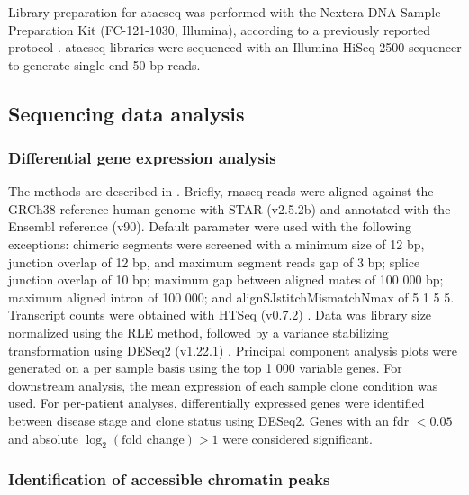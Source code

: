 \subsubsection{}

Library preparation for \gls{atacseq} was performed with the Nextera DNA Sample Preparation Kit (FC-121-1030, Illumina), according to a previously reported protocol \cite{buenrostroTranspositionNativeChromatin2013}.
\Gls{atacseq} libraries were sequenced with an Illumina HiSeq 2500 sequencer to generate single-end 50 bp reads.

\subsection{Sequencing data analysis}

\subsubsection{Differential gene expression analysis}

The methods are described in \cite[REF][]{dobsonRelapseFatedLatentDiagnosis2020}.
Briefly, \gls{rnaseq} reads were aligned against the GRCh38 reference human genome with STAR (v2.5.2b) \cite{dobinSTARUltrafastUniversal2013} and annotated with the Ensembl reference (v90).
Default parameter were used with the following exceptions: chimeric segments were screened with a minimum size of 12 bp, junction overlap of 12 bp, and maximum segment reads gap of 3 bp; splice junction overlap of 10 bp; maximum gap between aligned mates of 100 000 bp; maximum aligned intron of 100 000; and alignSJstitchMismatchNmax of 5 1 5 5.
Transcript counts were obtained with HTSeq (v0.7.2) \cite{andersHTSeqPythonFramework2015}.
Data was library size normalized using the RLE method, followed by a variance stabilizing transformation using DESeq2 (v1.22.1) \cite{loveModeratedEstimationFold2014}.
Principal component analysis plots were generated on a per sample basis using the top 1 000 variable genes.
For downstream analysis, the mean expression of each sample clone condition was used.
For per-patient analyses, differentially expressed genes were identified between disease stage and clone status using DESeq2.
Genes with an \gls{fdr} $< 0.05$ and absolute $\log_2(\text{fold change}) > 1$ were considered significant.

\subsubsection{Identification of accessible chromatin peaks}

